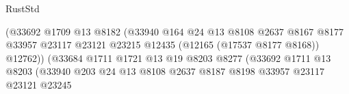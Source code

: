 \begin{lexlean}{RustStd}
\begin{coremodule}
                                                    (@33692
                                                      @1709
                                                      @13
                                                      @8182
                                                      (@33940
                                                        @164
                                                        @24
                                                        @13
                                                        @8108
                                                        @2637
                                                        @8167
                                                        @8177
                                                        @33957
                                                        @23117
                                                        @23121
                                                        @23215
                                                        @12435
                                                        (@12165 (@17537 @8177 @8168))
                                                        @12762))
                                                    (@33684
                                                      @1711
                                                      @1721
                                                      @13
                                                      @19
                                                      @8203
                                                      @8277
                                                      (@33692
                                                        @1711
                                                        @13
                                                        @8203
                                                        (@33940
                                                          @203
                                                          @24
                                                          @13
                                                          @8108
                                                          @2637
                                                          @8187
                                                          @8198
                                                          @33957
                                                          @23117
                                                          @23121
                                                          @23245

\end{coremodule}
\end{lexlean}
